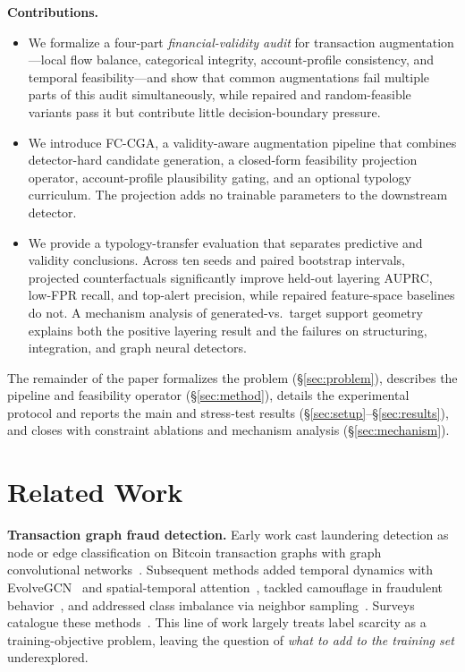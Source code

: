 \documentclass[sigconf,review,anonymous]{acmart}
\newcommand{\fcca}{\textsc{FC-CGA}\xspace}
\begin{document}
\smallskip
\noindent\textbf{Contributions.}
\begin{itemize}[leftmargin=*,topsep=2pt,itemsep=1pt]
\item We formalize a four-part \emph{financial-validity audit} for
      transaction augmentation---local flow balance, categorical integrity,
      account-profile consistency, and temporal feasibility---and show that
      common augmentations fail multiple parts of this audit simultaneously,
      while repaired and random-feasible variants pass it but contribute
      little decision-boundary pressure.
\item We introduce \fcca, a validity-aware augmentation pipeline that
      combines detector-hard candidate generation, a closed-form
      feasibility projection operator, account-profile plausibility gating,
      and an optional typology curriculum. The projection adds no trainable
      parameters to the downstream detector.
\item We provide a typology-transfer evaluation that separates predictive and
      validity conclusions. Across ten seeds and paired bootstrap intervals,
      projected counterfactuals significantly improve held-out layering
      AUPRC, low-FPR recall, and top-alert precision, while repaired
      feature-space baselines do not. A mechanism analysis of generated-vs.\
      target support geometry explains both the positive layering result and
      the failures on structuring, integration, and graph neural detectors.
\end{itemize}

The remainder of the paper formalizes the problem (\S\ref{sec:problem}),
describes the pipeline and feasibility operator (\S\ref{sec:method}), details
the experimental protocol and reports the main and stress-test results
(\S\ref{sec:setup}--\S\ref{sec:results}), and closes with constraint
ablations and mechanism analysis (\S\ref{sec:mechanism}).

\section{Related Work}
\label{sec:related}

\textbf{Transaction graph fraud detection.}
Early work cast laundering detection as node or edge classification on Bitcoin
transaction graphs with graph convolutional
networks~\cite{weber2019anti,weber2018eddying}.
Subsequent methods added temporal dynamics with
EvolveGCN~\cite{pareja2020evolvegcn} and spatial-temporal
attention~\cite{cheng2020graph}, tackled camouflage in fraudulent
behavior~\cite{dou2020enhancing}, and addressed class imbalance via neighbor
sampling~\cite{liu2021pick}. Surveys catalogue these
methods~\cite{pourhabibi2020fraud}. This line of work largely treats label
scarcity as a training-objective problem, leaving the question of
\emph{what to add to the training set} underexplored.
\end{document}
